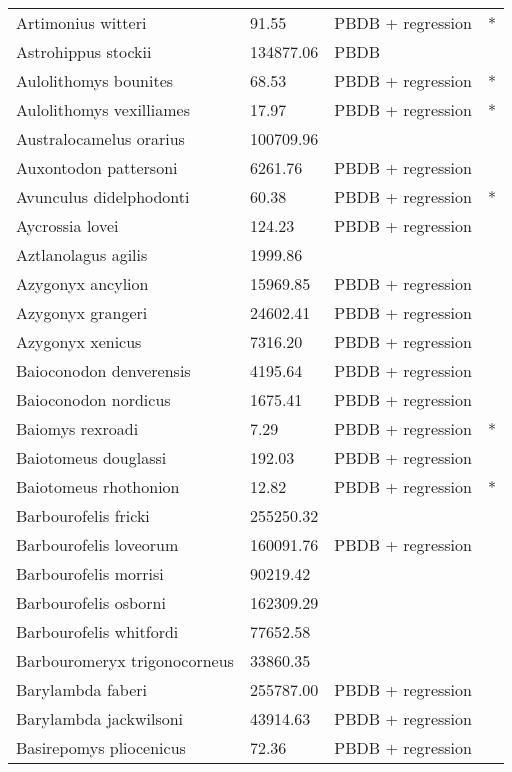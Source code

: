 \documentclass{article}
\begin{document}
\begin{center}
\begin{longtable}{p{} p{} p{} p{}}
    Artimonius witteri & 91.55 & PBDB + regression & * \\ 
    Astrohippus stockii & 134877.06 & PBDB &  \\ 
    Aulolithomys bounites & 68.53 & PBDB + regression & * \\ 
    Aulolithomys vexilliames & 17.97 & PBDB + regression & * \\ 
    Australocamelus orarius & 100709.96 & \cite{Tomiya2013} &  \\ 
    Auxontodon pattersoni & 6261.76 & PBDB + regression &  \\ 
    Avunculus didelphodonti & 60.38 & PBDB + regression & * \\ 
    Aycrossia lovei & 124.23 & PBDB + regression &  \\ 
    Aztlanolagus agilis & 1999.86 & \cite{Smith2004} &  \\ 
    Azygonyx ancylion & 15969.85 & PBDB + regression &  \\ 
    Azygonyx grangeri & 24602.41 & PBDB + regression &  \\ 
    Azygonyx xenicus & 7316.20 & PBDB + regression &  \\ 
    Baioconodon denverensis & 4195.64 & PBDB + regression &  \\ 
    Baioconodon nordicus & 1675.41 & PBDB + regression &  \\ 
    Baiomys rexroadi & 7.29 & PBDB + regression & * \\ 
    Baiotomeus douglassi & 192.03 & PBDB + regression &  \\ 
    Baiotomeus rhothonion & 12.82 & PBDB + regression & * \\ 
    Barbourofelis fricki & 255250.32 & \cite{Tomiya2013} &  \\ 
    Barbourofelis loveorum & 160091.76 & PBDB + regression &  \\ 
    Barbourofelis morrisi & 90219.42 & \cite{Tomiya2013} &  \\ 
    Barbourofelis osborni & 162309.29 & \cite{Martin2002a} &  \\ 
    Barbourofelis whitfordi & 77652.58 & \cite{Tomiya2013} &  \\ 
    Barbouromeryx trigonocorneus & 33860.35 & \cite{Tomiya2013} &  \\ 
    Barylambda faberi & 255787.00 & PBDB + regression &  \\ 
    Barylambda jackwilsoni & 43914.63 & PBDB + regression &  \\ 
    Basirepomys pliocenicus & 72.36 & PBDB + regression &  \\ 

\end{longtable}
\end{center}
\end{document}
